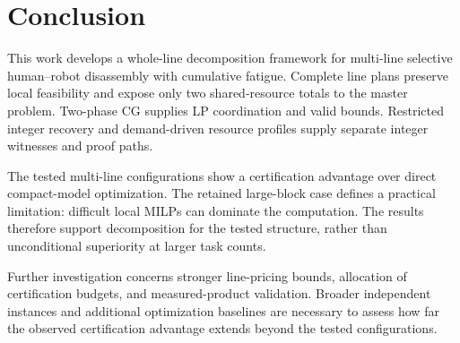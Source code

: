 \section{Conclusion}\label{sec:conclusion}
This work develops a whole-line decomposition framework for multi-line selective human--robot disassembly with cumulative fatigue. Complete line plans preserve local feasibility and expose only two shared-resource totals to the master problem. Two-phase CG supplies LP coordination and valid bounds. Restricted integer recovery and demand-driven resource profiles supply separate integer witnesses and proof paths.

The tested multi-line configurations show a certification advantage over direct compact-model optimization. The retained large-block case defines a practical limitation: difficult local MILPs can dominate the computation. The results therefore support decomposition for the tested structure, rather than unconditional superiority at larger task counts.

Further investigation concerns stronger line-pricing bounds, allocation of certification budgets, and measured-product validation. Broader independent instances and additional optimization baselines are necessary to assess how far the observed certification advantage extends beyond the tested configurations.
